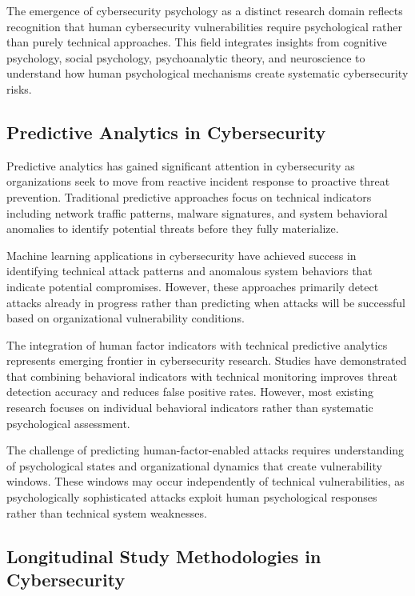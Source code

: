\documentclass[10pt, twocolumn]{article}
\begin{document}
The emergence of cybersecurity psychology as a distinct research domain reflects recognition that human cybersecurity vulnerabilities require psychological rather than purely technical approaches. This field integrates insights from cognitive psychology, social psychology, psychoanalytic theory, and neuroscience to understand how human psychological mechanisms create systematic cybersecurity risks\cite{canale2024}.

\subsection{Predictive Analytics in Cybersecurity}

Predictive analytics has gained significant attention in cybersecurity as organizations seek to move from reactive incident response to proactive threat prevention. Traditional predictive approaches focus on technical indicators including network traffic patterns, malware signatures, and system behavioral anomalies to identify potential threats before they fully materialize.

Machine learning applications in cybersecurity have achieved success in identifying technical attack patterns and anomalous system behaviors that indicate potential compromises. However, these approaches primarily detect attacks already in progress rather than predicting when attacks will be successful based on organizational vulnerability conditions.

The integration of human factor indicators with technical predictive analytics represents emerging frontier in cybersecurity research. Studies have demonstrated that combining behavioral indicators with technical monitoring improves threat detection accuracy and reduces false positive rates\cite{chen2023}. However, most existing research focuses on individual behavioral indicators rather than systematic psychological assessment.

The challenge of predicting human-factor-enabled attacks requires understanding of psychological states and organizational dynamics that create vulnerability windows. These windows may occur independently of technical vulnerabilities, as psychologically sophisticated attacks exploit human psychological responses rather than technical system weaknesses.

\subsection{Longitudinal Study Methodologies in Cybersecurity}
\end{document}
